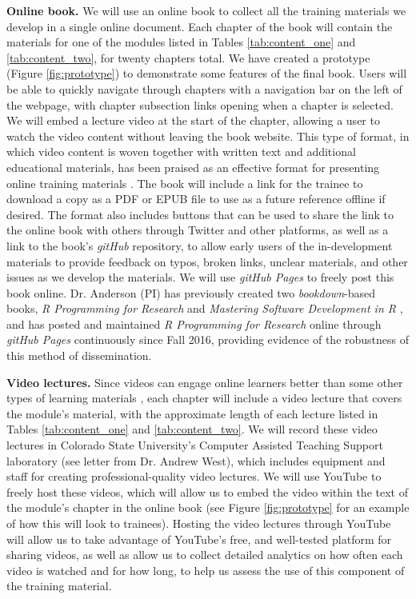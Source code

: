 \documentclass[pdftex,english,11.5pt,parskip=half]{scrartcl}
\begin{document}
\textbf{Online book.} We will use an online book to collect all the training
materials we develop in a single online document. Each chapter of the book will contain the
materials for one of the modules listed in Tables \ref*{tab:content_one} and
\ref*{tab:content_two}, for twenty chapters total. We have created a prototype
(Figure \ref*{fig:prototype}) to demonstrate some features of the final book.
Users will be able to quickly navigate through chapters with a navigation bar on
the left of the webpage, with chapter subsection links opening when a chapter is
selected. We will embed a lecture video at the start of the chapter, allowing
a user to watch the video content without leaving the book website. This type of format, 
in which video content is woven together with written text and additional educational materials, has been
praised as an effective format for presenting online training materials \cite{searls2012online}.
The book will
include a link for the trainee to download a copy as a PDF or EPUB file to use
as a future reference offline if desired. The format also includes buttons that
can be used to share the link to the online book with others through Twitter and
other platforms, as well as a link to the book's \textit{gitHub} repository, to allow
early users of the in-development materials to provide feedback on typos, broken
links, unclear materials, and other issues as we develop the
materials. 
We will use \textit{gitHub Pages} \cite{gitpages} to
freely post this book online. Dr. Anderson (PI) has previously created two
\textit{bookdown}-based books, \textit{R Programming for Research} \cite{andersoncoursebook} and
\textit{Mastering Software Development in R} \cite{andersonmastering}, and has posted and maintained
\textit{R Programming for Research} online through \textit{gitHub Pages} continuously since Fall 2016, providing evidence of the robustness of this method of dissemination.  

\textbf{Video lectures.} 
Since videos can engage online learners better than some other types of learning materials \cite{searls2012ten}, each chapter will include a video lecture that covers
the module's material, with the approximate length of each lecture listed in
Tables \ref*{tab:content_one} and \ref*{tab:content_two}. We will record these
video lectures in Colorado State University's Computer Assisted Teaching Support laboratory (see
letter from Dr. Andrew West), which includes equipment and staff for creating
professional-quality video lectures. We will use YouTube \cite{youtube} to freely host these
videos, which will allow us to embed the video within the text of the module's chapter in the
online book (see Figure \ref*{fig:prototype} for an example of how this will look
to trainees). Hosting the video lectures through YouTube will allow
us to take advantage of YouTube's free, and well-tested platform for
sharing videos, as well as allow us to collect detailed analytics on how often
each video is watched and for how long, to help us assess the use of this
component of the training material. 
\end{document}
